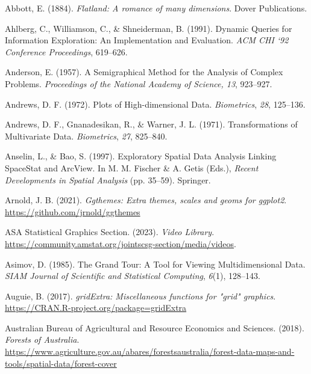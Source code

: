 \documentclass[
  letterpaper,
]{book}
\newlength{\cslhangindent}
\newlength{\cslentryspacingunit} %
\newenvironment{CSLReferences}[2] %
 {%
  \setlength{\parindent}{0pt}
  \ifodd #1
  \let\oldpar\par
  \def\par{\hangindent=\cslhangindent\oldpar}
  \fi
  \setlength{\parskip}{#2\cslentryspacingunit}
 }%
 {}
\begin{document}
\hypertarget{refs}{}
\begin{CSLReferences}{1}{0}
\leavevmode{}%
Abbott, E. (1884). \emph{Flatland: A romance of many dimensions}. Dover
Publications.

\leavevmode{}%
Ahlberg, C., Williamson, C., \& Shneiderman, B. (1991). Dynamic
{Q}ueries for {I}nformation {E}xploration: {A}n {I}mplementation and
{E}valuation. \emph{ACM CHI `92 Conference Proceedings}, 619--626.

\leavevmode{}%
Anderson, E. (1957). A {S}emigraphical {M}ethod for the {A}nalysis of
{C}omplex {P}roblems. \emph{Proceedings of the National Academy of
Science, 13}, 923--927.

\leavevmode{}%
Andrews, D. F. (1972). {P}lots of {H}igh-dimensional {D}ata.
\emph{Biometrics}, \emph{28}, 125--136.

\leavevmode{}%
Andrews, D. F., Gnanadesikan, R., \& Warner, J. L. (1971).
{T}ransformations of {M}ultivariate {D}ata. \emph{Biometrics},
\emph{27}, 825--840.

\leavevmode{}%
Anselin, L., \& Bao, S. (1997). {E}xploratory {S}patial {D}ata
{A}nalysis {L}inking {S}pace{S}tat and {A}rc{V}iew. In M. M. Fischer \&
A. Getis (Eds.), \emph{{R}ecent {D}evelopments in {S}patial {A}nalysis}
(pp. 35--59). Springer.

\leavevmode{}%
Arnold, J. B. (2021). \emph{Ggthemes: Extra themes, scales and geoms for
ggplot2}. \url{https://github.com/jrnold/ggthemes}

\leavevmode{}%
ASA Statistical Graphics Section. (2023). \emph{Video {L}ibrary}.
\url{https://community.amstat.org/jointscsg-section/media/videos}.

\leavevmode{}%
Asimov, D. (1985). {T}he {G}rand {T}our: {A} {T}ool for {V}iewing
{M}ultidimensional {D}ata. \emph{SIAM Journal of Scientific and
Statistical Computing}, \emph{6}(1), 128--143.

\leavevmode{}%
Auguie, B. (2017). \emph{gridExtra: Miscellaneous functions for "grid"
graphics}. \url{https://CRAN.R-project.org/package=gridExtra}

\leavevmode{}%
Australian Bureau of Agricultural and Resource Economics and Sciences.
(2018). \emph{{Forests of Australia}}.
\url{https://www.agriculture.gov.au/abares/forestsaustralia/forest-data-maps-and-tools/spatial-data/forest-cover}


\end{CSLReferences}
\end{document}

